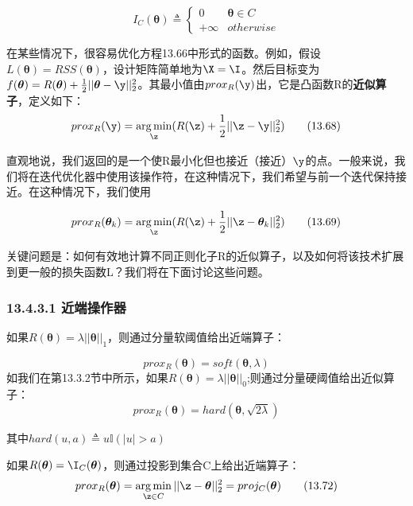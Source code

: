 \documentclass[a4paper]{article}
\DeclareMathOperator*{\argmin}{arg\,min}
\begin{document}
\begin{equation}
	I_C(\boldsymbol{\theta})\triangleq \left\{
	\begin{array}{ll}
	0 &  \boldsymbol{\theta}\in C\\
	+\infty & otherwise 
	\end{array} \right.\tag{13.67}
\end{equation}

在某些情况下，很容易优化方程13.66中形式的函数。例如，假设$L(\boldsymbol{\theta})=RSS(\boldsymbol{\theta})$，设计矩阵简单地为$\X=\I$。然后目标变为$f(\boldsymbol{\theta})=R(\boldsymbol{\theta})+\frac{1}{2}||\boldsymbol{\theta}-\y||_2^2$。其最小值由$prox_R(\y)$出，它是凸函数R的\textbf{近似算子}，定义如下：
\begin{equation}
	prox_R(\y)=\argmin_\z(R(\z)+\frac{1}{2}||\z-\y||_2^2)\tag{13.68}
\end{equation}

直观地说，我们返回的是一个使R最小化但也接近（接近）$\y$的点。一般来说，我们将在迭代优化器中使用该操作符，在这种情况下，我们希望与前一个迭代保持接近。在这种情况下，我们使用

\begin{equation}
prox_R(\boldsymbol{\theta}_k)=\argmin_\z(R(\z)+\frac{1}{2}||\z-\boldsymbol{\theta}_k||_2^2)\tag{13.69}
\end{equation}

关键问题是：如何有效地计算不同正则化子R的近似算子，以及如何将该技术扩展到更一般的损失函数L？我们将在下面讨论这些问题。
\subsubsection*{13.4.3.1 近端操作器}
如果$R(\boldsymbol{\theta})=\lambda||\boldsymbol{\theta}||_1$，则通过分量软阈值给出近端算子：

\begin{equation}
	prox_R(\boldsymbol{\theta})=soft(\boldsymbol{\theta},\lambda)\tag{13.70}
\end{equation}
如我们在第13.3.2节中所示，如果$R(\boldsymbol{\theta})=\lambda||\boldsymbol{\theta}||_0$;则通过分量硬阈值给出近似算子：
\begin{equation}
	prox_R(\boldsymbol{\theta})=hard(\boldsymbol{\theta},\sqrt{2\lambda})\tag{13.71}
\end{equation}

其中$hard(u,a)\triangleq u\mathbb{I}(|u|>a)$

如果$R(\boldsymbol{\theta})=\I_C(\boldsymbol{\theta})$，则通过投影到集合C上给出近端算子：
\begin{equation}
	prox_R(\boldsymbol{\theta})=\argmin_{\z\in C}||\z-\boldsymbol{\theta}||_2^2=proj_C(\boldsymbol{\theta})\tag{13.72}
\end{equation}
\end{document}
